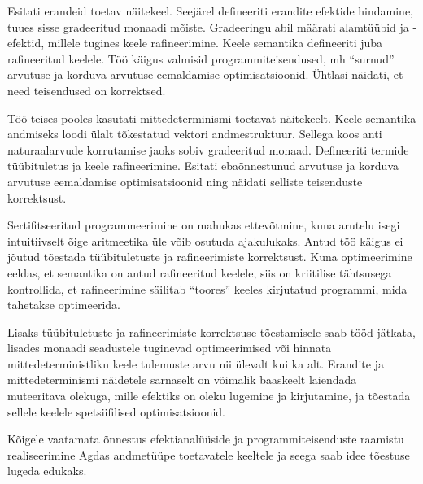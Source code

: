 \documentclass[a4paper,12pt]{article}
\begin{document}
Esitati erandeid toetav näitekeel.
Seejärel defineeriti erandite efektide hindamine, tuues sisse gradeeritud monaadi mõiste.
Gradeeringu abil määrati alamtüübid ja -efektid, millele tugines keele rafineerimine.
Keele semantika defineeriti juba rafineeritud keelele.
Töö käigus valmisid programmiteisendused, mh ``surnud'' arvutuse ja korduva arvutuse eemaldamise optimisatsioonid.
Ühtlasi näidati, et need teisendused on korrektsed.

Töö teises pooles kasutati mittedeterminismi toetavat näitekeelt.
Keele semantika andmiseks loodi ülalt tõkestatud vektori andmestruktuur.
Sellega koos anti naturaalarvude korrutamise jaoks sobiv gradeeritud monaad.
Defineeriti termide tüübituletus ja keele rafineerimine.
Esitati ebaõnnestunud arvutuse ja korduva arvutuse eemaldamise optimisatsioonid ning näidati selliste teisenduste korrektsust.

Sertifitseeritud programmeerimine on mahukas ettevõtmine, kuna arutelu isegi intuitiivselt õige aritmeetika üle võib osutuda ajakulukaks.
Antud töö käigus ei jõutud tõestada tüübituletuste ja rafineerimiste korrektsust.
Kuna optimeerimine eeldas, et semantika on antud rafineeritud keelele, siis on kriitilise tähtsusega kontrollida, et rafineerimine säilitab ``toores'' keeles kirjutatud programmi, mida tahetakse optimeerida.

Lisaks tüübituletuste ja rafineerimiste korrektsuse tõestamisele saab tööd jätkata, lisades monaadi seadustele tuginevad optimeerimised või hinnata mittedeterministliku keele tulemuste arvu nii ülevalt kui ka alt.
Erandite ja mittedeterminismi näidetele sarnaselt on võimalik baaskeelt laiendada muteeritava olekuga, mille efektiks on oleku lugemine ja kirjutamine, ja tõestada sellele keelele spetsiifilised optimisatsioonid.


Kõigele vaatamata õnnestus efektianalüüside ja programmiteisenduste raamistu realiseerimine Agdas andmetüüpe toetavatele keeltele ja seega saab idee tõestuse lugeda edukaks.

\clearpage\vspace*{0pt}

\renewcommand{\baselinestretch}{1.15}
\small


\end{document}
